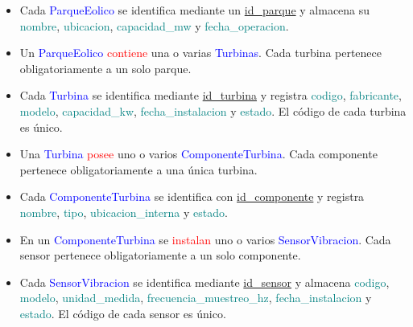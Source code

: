 \documentclass[11pt,a4paper]{article}
\begin{document}
\begin{itemize}

    \item Cada \textcolor{blue}{ParqueEolico} se identifica mediante un
    \underline{id\_parque} y almacena su \textcolor{teal}{nombre},
    \textcolor{teal}{ubicacion}, \textcolor{teal}{capacidad\_mw} y
    \textcolor{teal}{fecha\_operacion}.
    \par\bigskip

    \item Un \textcolor{blue}{ParqueEolico} \textcolor{red}{contiene} una o varias
    \textcolor{blue}{Turbinas}. Cada turbina pertenece obligatoriamente a un solo
    parque.
    \par\bigskip

    \item Cada \textcolor{blue}{Turbina} se identifica mediante
    \underline{id\_turbina} y registra \textcolor{teal}{codigo},
    \textcolor{teal}{fabricante}, \textcolor{teal}{modelo},
    \textcolor{teal}{capacidad\_kw}, \textcolor{teal}{fecha\_instalacion} y
    \textcolor{teal}{estado}. El código de cada turbina es único.
    \par\bigskip

    \item Una \textcolor{blue}{Turbina} \textcolor{red}{posee} uno o varios
    \textcolor{blue}{ComponenteTurbina}. Cada componente pertenece obligatoriamente
    a una única turbina.
    \par\bigskip

    \item Cada \textcolor{blue}{ComponenteTurbina} se identifica con
    \underline{id\_componente} y registra \textcolor{teal}{nombre},
    \textcolor{teal}{tipo}, \textcolor{teal}{ubicacion\_interna} y
    \textcolor{teal}{estado}.
    \par\bigskip

    \item En un \textcolor{blue}{ComponenteTurbina} se
    \textcolor{red}{instalan} uno o varios \textcolor{blue}{SensorVibracion}. Cada
    sensor pertenece obligatoriamente a un solo componente.
    \par\bigskip

    \item Cada \textcolor{blue}{SensorVibracion} se identifica mediante
    \underline{id\_sensor} y almacena \textcolor{teal}{codigo},
    \textcolor{teal}{modelo}, \textcolor{teal}{unidad\_medida},
    \textcolor{teal}{frecuencia\_muestreo\_hz},
    \textcolor{teal}{fecha\_instalacion} y \textcolor{teal}{estado}. El código de
    cada sensor es único.
    \par\bigskip


\end{itemize}
\end{document}
